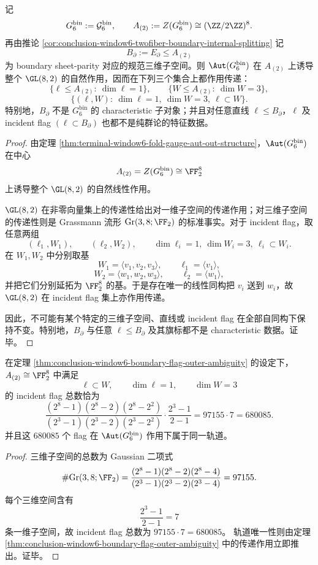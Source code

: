 \begin{theorem}\label{thm:conclusion-window6-boundary-flag-outer-ambiguity}
记
\[
G_6^{\mathrm{bin}}:=\mathcal G_6^{\mathrm{bin}},
\qquad
A_{(2)}:=Z(G_6^{\mathrm{bin}})\cong (\ZZ/2\ZZ)^8.
\]
再由推论 \ref{cor:conclusion-window6-twofiber-boundary-internal-splitting} 记
\[
B_\partial:=E_\partial\le A_{(2)}
\]
为 boundary sheet-parity 对应的规范三维子空间。则 \(\Aut(G_6^{\mathrm{bin}})\) 在 \(A_{(2)}\) 上诱导整个 \(\GL(8,2)\) 的自然作用，因而在下列三个集合上都作用传递：
\[
\{\ell\le A_{(2)}:\ \dim \ell=1\},
\qquad
\{W\le A_{(2)}:\ \dim W=3\},
\]
\[
\{(\ell,W):\ \dim \ell=1,\ \dim W=3,\ \ell\subset W\}.
\]
特别地，\(B_\partial\) 不是 \(G_6^{\mathrm{bin}}\) 的 characteristic 子对象；并且对任意直线 \(\ell\le B_\partial\)，\(\ell\) 及 incident flag \((\ell\subset B_\partial)\) 也都不是纯群论的特征数据。
\end{theorem}
\begin{proof}
由定理 \ref{thm:terminal-window6-fold-gauge-aut-out-structure}，\(\Aut(G_6^{\mathrm{bin}})\) 在中心
\[
A_{(2)}=Z(G_6^{\mathrm{bin}})\cong \FF_2^8
\]
上诱导整个 \(\GL(8,2)\) 的自然线性作用。

\(\GL(8,2)\) 在非零向量集上的传递性给出对一维子空间的传递作用；对三维子空间的传递性则是 Grassmann 流形 \(\mathrm{Gr}(3,8;\FF_2)\) 的标准事实。对于 incident flag，取任意两组
\[
(\ell_1,W_1),\qquad (\ell_2,W_2),
\qquad
\dim \ell_i=1,\ \dim W_i=3,\ \ell_i\subset W_i.
\]
在 \(W_1,W_2\) 中分别取基
\[
W_1=\langle v_1,v_2,v_3\rangle,\qquad \ell_1=\langle v_1\rangle,
\]
\[
W_2=\langle w_1,w_2,w_3\rangle,\qquad \ell_2=\langle w_1\rangle,
\]
并把它们分别延拓为 \(\FF_2^8\) 的基。于是存在唯一的线性同构把 \(v_i\) 送到 \(w_i\)，故 \(\GL(8,2)\) 在 incident flag 集上亦作用传递。

因此，不可能有某个特定的三维子空间、直线或 incident flag 在全部自同构下保持不变。特别地，\(B_\partial\) 与任意 \(\ell\le B_\partial\) 及其旗标都不是 characteristic 数据。证毕。
\end{proof}

\begin{corollary}\label{cor:conclusion-window6-680085-dyadic-flags}
在定理 \ref{thm:conclusion-window6-boundary-flag-outer-ambiguity} 的设定下，\(A_{(2)}\cong \FF_2^8\) 中满足
\[
\ell\subset W,
\qquad
\dim \ell=1,
\qquad
\dim W=3
\]
的 incident flag 总数恰为
\[
\frac{(2^8-1)(2^8-2)(2^8-2^2)}{(2^3-1)(2^3-2)(2^3-2^2)}
\cdot
\frac{2^3-1}{2-1}
=
97155\cdot 7
=
680085.
\]
并且这 \(680085\) 个 flag 在 \(\Aut(G_6^{\mathrm{bin}})\) 作用下属于同一轨道。
\end{corollary}
\begin{proof}
三维子空间的总数为 Gaussian 二项式
\[
\#\mathrm{Gr}(3,8;\FF_2)
=
\frac{(2^8-1)(2^8-2)(2^8-4)}{(2^3-1)(2^3-2)(2^3-4)}
=
97155.
\]
每个三维空间含有
\[
\frac{2^3-1}{2-1}=7
\]
条一维子空间，故 incident flag 总数为 \(97155\cdot 7=680085\)。
轨道唯一性则由定理 \ref{thm:conclusion-window6-boundary-flag-outer-ambiguity} 中的传递作用立即推出。证毕。
\end{proof}

